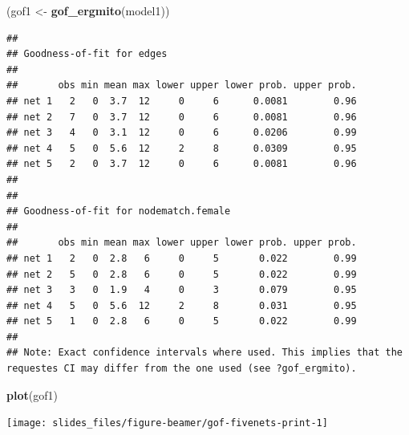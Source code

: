 \documentclass[10pt,ignorenonframetext,handout,aspectratio=169,]{beamer}
\newenvironment{Shaded}{\begin{snugshade}}{\end{snugshade}}
\newcommand{\KeywordTok}[1]{\textcolor[rgb]{0.13,0.29,0.53}{\textbf{#1}}}
\newcommand{\NormalTok}[1]{#1}
\newcommand{\StringTok}[1]{\textcolor[rgb]{0.31,0.60,0.02}{#1}}
\begin{document}
\begin{frame}[fragile]

\footnotesize

\begin{Shaded}
\begin{Highlighting}[]
\NormalTok{(gof1 <-}\StringTok{ }\KeywordTok{gof_ergmito}\NormalTok{(model1))}
\end{Highlighting}
\end{Shaded}

\begin{verbatim}
## 
## Goodness-of-fit for edges 
## 
##       obs min mean max lower upper lower prob. upper prob.
## net 1   2   0  3.7  12     0     6      0.0081        0.96
## net 2   7   0  3.7  12     0     6      0.0081        0.96
## net 3   4   0  3.1  12     0     6      0.0206        0.99
## net 4   5   0  5.6  12     2     8      0.0309        0.95
## net 5   2   0  3.7  12     0     6      0.0081        0.96
## 
## 
## Goodness-of-fit for nodematch.female 
## 
##       obs min mean max lower upper lower prob. upper prob.
## net 1   2   0  2.8   6     0     5       0.022        0.99
## net 2   5   0  2.8   6     0     5       0.022        0.99
## net 3   3   0  1.9   4     0     3       0.079        0.95
## net 4   5   0  5.6  12     2     8       0.031        0.95
## net 5   1   0  2.8   6     0     5       0.022        0.99
## 
## Note: Exact confidence intervals where used. This implies that the requestes CI may differ from the one used (see ?gof_ergmito).
\end{verbatim}

\normalsize

\end{frame}

\begin{frame}[fragile]

\footnotesize

\begin{Shaded}
\begin{Highlighting}[]
\KeywordTok{plot}\NormalTok{(gof1)}
\end{Highlighting}
\end{Shaded}

\begin{center}\texttt{[image: slides\_files/figure-beamer/gof-fivenets-print-1]} \end{center}

\normalsize

\end{frame}
\end{document}
